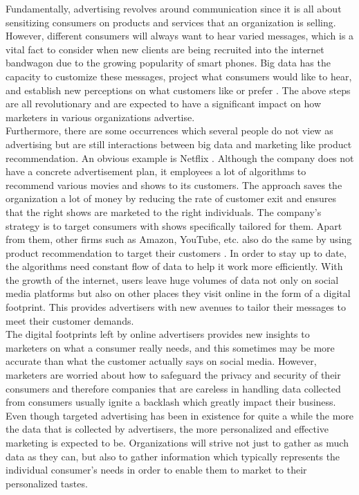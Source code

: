 \documentclass[sigconf]{acmart}
\begin{document}
Fundamentally, advertising revolves around communication since it is all about sensitizing consumers on products and services that an organization is selling. However, different consumers will always want to hear varied messages, which is a vital fact to consider when new clients are being recruited into the internet bandwagon due to the growing popularity of smart phones. Big data has the capacity to customize these messages, project what consumers would like to hear, and establish new perceptions on what customers like or prefer \cite{HenselandDeis2010}. The above steps are all revolutionary and are expected to have a significant impact on how marketers in various organizations advertise.   \\
Furthermore, there are some occurrences which several people do not view as advertising but are still interactions between big data and marketing like product recommendation. An obvious example is Netflix \cite{Eastwood2017}. Although the company does not have a concrete advertisement plan, it employees a lot of algorithms to recommend various movies and shows to its customers. The approach saves the organization a lot of money by reducing the rate of customer exit and ensures that the right shows are marketed to the right individuals. The company’s strategy is to target consumers with shows specifically tailored for them. Apart from them, other firms such as Amazon, YouTube, etc. also do the same by using product recommendation to target their customers  \cite{Eastwood2017}. In order to stay up to date, the algorithms need constant flow of data to help it work more efficiently. With the growth of the internet, users leave huge volumes of data not only on social media platforms but also on other places they visit online in the form of a digital footprint.  This provides advertisers with new avenues to tailor their messages to meet their customer demands.  \\
The digital footprints left by online advertisers provides new insights to marketers on what a consumer really needs, and this sometimes may be more accurate than what the customer actually says on social media. However, marketers are worried about how to safeguard the privacy and security of their consumers and therefore companies that are careless in handling data collected from consumers usually ignite a backlash which greatly impact their business. Even though targeted advertising has been in existence for quite a while \cite{Eastwood2017} the more the data that is collected by advertisers, the more personalized and effective marketing is expected to be. Organizations will strive not just to gather as much data as they can, but also to gather information which typically represents the individual consumer’s needs in order to enable them to market to their personalized tastes.
\end{document}
